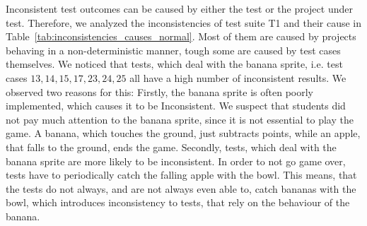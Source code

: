 Inconsistent test outcomes can be caused by either the test or the project under test.
Therefore, we analyzed the inconsistencies of test suite T1 and their cause in Table~\ref{tab:inconsistencies_causes_normal}.
Most of them are caused by projects behaving in a non-deterministic manner,
tough some are caused by test cases themselves.
We noticed that tests, which deal with the banana sprite, i.e. test cases $13, 14, 15, 17, 23, 24, 25$ all have a high number of inconsistent results.
We observed two reasons for this:
Firstly, the banana sprite is often poorly implemented, which causes it to be Inconsistent.
We suspect that students did not pay much attention to the banana sprite, since it is not essential to play the game.
A banana, which touches the ground, just subtracts points, while an apple, that falls to the ground, ends the game.
Secondly, tests, which deal with the banana sprite are more likely to be inconsistent.
In order to not go game over, tests have to periodically catch the falling apple with the bowl.
This means, that the tests do not always, and are not always even able to, catch bananas with the bowl,
which introduces inconsistency to tests, that rely on the behaviour of the banana.
\parspace

